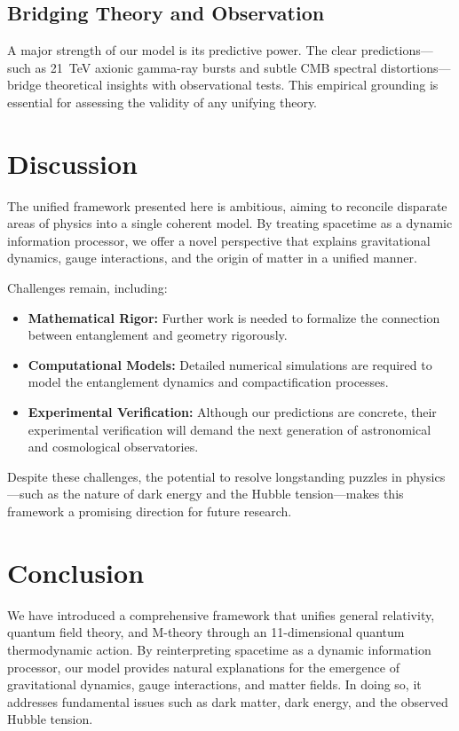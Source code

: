 \documentclass[12pt, a4paper]{article}
\begin{document}
\subsection{Bridging Theory and Observation}
A major strength of our model is its predictive power. The clear predictions—such as 21~TeV axionic gamma-ray bursts and subtle CMB spectral distortions—bridge theoretical insights with observational tests. This empirical grounding is essential for assessing the validity of any unifying theory.

\section{Discussion}
The unified framework presented here is ambitious, aiming to reconcile disparate areas of physics into a single coherent model. By treating spacetime as a dynamic information processor, we offer a novel perspective that explains gravitational dynamics, gauge interactions, and the origin of matter in a unified manner.

Challenges remain, including:
\begin{itemize}
    \item \textbf{Mathematical Rigor:} Further work is needed to formalize the connection between entanglement and geometry rigorously.
    \item \textbf{Computational Models:} Detailed numerical simulations are required to model the entanglement dynamics and compactification processes.
    \item \textbf{Experimental Verification:} Although our predictions are concrete, their experimental verification will demand the next generation of astronomical and cosmological observatories.
\end{itemize}
Despite these challenges, the potential to resolve longstanding puzzles in physics—such as the nature of dark energy and the Hubble tension—makes this framework a promising direction for future research.

\section{Conclusion}
We have introduced a comprehensive framework that unifies general relativity, quantum field theory, and M-theory through an 11-dimensional quantum thermodynamic action. By reinterpreting spacetime as a dynamic information processor, our model provides natural explanations for the emergence of gravitational dynamics, gauge interactions, and matter fields. In doing so, it addresses fundamental issues such as dark matter, dark energy, and the observed Hubble tension.
\end{document}
